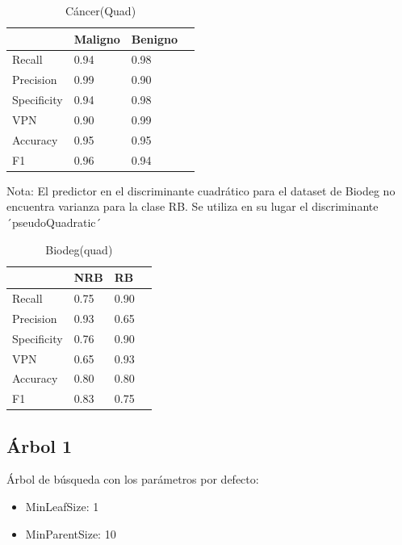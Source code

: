 \documentclass[a4paper,openwrite,12pt]{article}
\begin{document}
\begin{table}[H]
\centering
\begin{tabular}{@{}llll@{}}
\toprule
            & Maligno & Benigno &  \\ \midrule
Recall      & 0.94    & 0.98    &  \\
Precision   & 0.99   & 0.90    &  \\
Specificity & 0.94    & 0.98    &  \\
VPN         & 0.90    & 0.99    &  \\
Accuracy    & 0.95    & 0.95    &  \\
F1          & 0.96    & 0.94    &  \\ \bottomrule
\end{tabular}
\caption{Cáncer(Quad)}
\end{table}

Nota: El predictor en el discriminante cuadrático para el dataset de Biodeg no encuentra varianza para la clase RB. Se utiliza en su lugar el discriminante ´pseudoQuadratic´
\begin{table}[H]
\centering
\begin{tabular}{@{}llll@{}}
\toprule
            & NRB &   RB &  \\ \midrule
Recall      & 0.75    & 0.90    &  \\
Precision   & 0.93    & 0.65    &  \\
Specificity & 0.76    & 0.90    &  \\
VPN         & 0.65    & 0.93    &  \\
Accuracy    & 0.80    & 0.80    &  \\
F1          & 0.83    & 0.75    &  \\ \bottomrule
\end{tabular}
\caption{Biodeg(quad)}
\end{table}


\subsection{Árbol 1}

Árbol de búsqueda con los parámetros por defecto:

\begin{itemize}
    \item MinLeafSize: 1
    \item MinParentSize: 10
\end{itemize}
\end{document}
